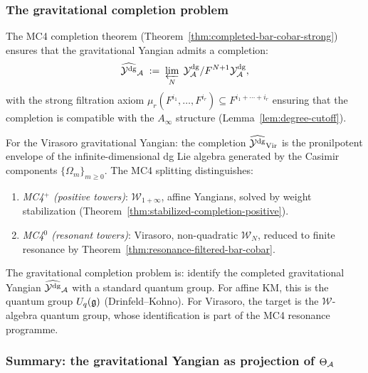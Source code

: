\subsubsection{The gravitational completion problem}

\begin{remark}
\label{rem:thqg-V-gravitational-completion}
The MC4 completion theorem
(Theorem~\ref{thm:completed-bar-cobar-strong}) ensures that the
gravitational Yangian admits a completion:
\begin{equation}\label{eq:thqg-V-completion}
\widehat{\mathcal{Y}^{\mathrm{dg}}}_{\mathcal{A}}
\;:=\;
\varprojlim_{N}\;
\mathcal{Y}^{\mathrm{dg}}_{\mathcal{A}} / F^{N+1}\mathcal{Y}^{\mathrm{dg}}_{\mathcal{A}},
\end{equation}
with the strong filtration axiom
$\mu_r(F^{i_1},\dotsc,F^{i_r}) \subseteq F^{i_1+\cdots+i_r}$
ensuring that the completion is compatible with the $A_\infty$
structure (Lemma~\ref{lem:degree-cutoff}).

For the Virasoro gravitational Yangian: the completion
$\widehat{\mathcal{Y}^{\mathrm{dg}}}_{\mathrm{Vir}}$ is the pronilpotent envelope of
the infinite-dimensional dg Lie algebra generated by the Casimir
components $\{\Omega_m\}_{m \geq 0}$. The MC4 splitting
distinguishes:
\begin{enumerate}[label=\textup{(\roman*)}]
\item \emph{MC4$^+$ (positive towers)}:
 $\mathcal{W}_{1+\infty}$, affine Yangians, solved by weight
 stabilization
 (Theorem~\ref{thm:stabilized-completion-positive}).
\item \emph{MC4$^0$ (resonant towers)}:
 Virasoro, non-quadratic $\mathcal{W}_N$, reduced to finite
 resonance by
 Theorem~\ref{thm:resonance-filtered-bar-cobar}.
\end{enumerate}
The gravitational completion problem is: identify the completed
gravitational Yangian $\widehat{\mathcal{Y}^{\mathrm{dg}}}_{\mathcal{A}}$ with a standard
quantum group. For affine KM, this is the quantum group
$U_q(\mathfrak{g})$ (Drinfeld--Kohno). For Virasoro, the target is the
$\mathcal{W}$-algebra quantum group, whose identification is
part of the MC4 resonance programme.
\end{remark}


\subsubsection{Summary: the gravitational Yangian as projection of $\Theta_{\mathcal{A}}$}

